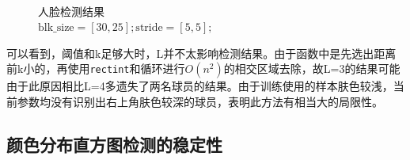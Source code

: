 \documentclass[10pt, a4paper]{article}
\begin{document}
\begin{figure}[ht!]
    \centering
    \quad
    \\
    \quad
    \caption{人脸检测结果\\$\text{blk\_size} = [30, 25];\text{stride} = [5, 5];$}
    \label{fig:exp4_2_result}
\end{figure}

可以看到，阈值和k足够大时，L并不太影响检测结果。由于函数中是先选出距离前k小的，再使用\texttt{rectint}和循环进行$O(n^2)$的相交区域去除，故L=3的结果可能由于此原因相比L=4多遗失了两名球员的结果。由于训练使用的样本肤色较浅，当前参数均没有识别出右上角肤色较深的球员，表明此方法有相当大的局限性。

\subsection{颜色分布直方图检测的稳定性}
\end{document}
